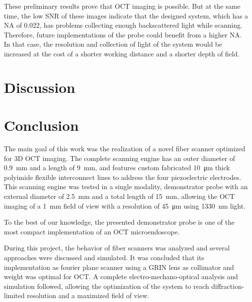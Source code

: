\documentclass[10pt]{iopart}
\begin{document}
These preliminary results prove that OCT imaging is possible. But at the same time, the low SNR of these images indicate that the designed system, which has a NA of 0.022, has problems collecting enough backscattered light while scanning. Therefore, future implementations of the probe could benefit from a higher NA. In that case, the resolution and collection of light of the system would be increased at the cost of a shorter working distance and a shorter depth of field. 



\section{Discussion}


\section{Conclusion}

The main goal of this work was the realization of a novel fiber scanner optimized for 3D OCT imaging. The complete scanning engine has an outer diameter of \SI{0.9}{\milli\meter} and a length of \SI{9}{\milli\meter}, and features custom fabricated \SI{10}{\micro\meter} thick polyimide flexible interconnect lines to address the four piezoelectric electrodes. This scanning engine was tested in a single modality, demonstrator probe with an external diameter of \SI{2.5}{\milli\meter} and a total length of \SI{15}{\milli\meter}, allowing the OCT imaging of a \SI{1}{\milli\meter} field of view with a resolution of \SI{45}{\micro\meter} using \SI{1330}{\nano\meter} light. 

To the best of our knowledge, the presented demonstrator probe is one of the most compact implementation of an OCT microendoscope.

During this project, the behavior of fiber scanners was analyzed and several approaches were discussed and simulated. It was concluded that its implementation as fourier plane scanner using a GRIN lens as collimator and weight was optimal for OCT. A complete electro-mechano-optical analysis and simulation followed, allowing the optimization of the system to reach diffraction-limited resolution and a maximized field of view.
\end{document}
